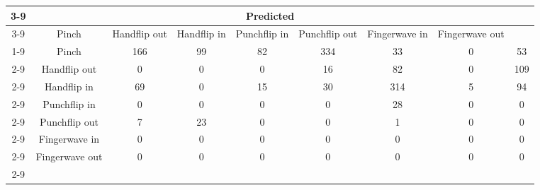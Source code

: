 \documentclass{standalone}
\begin{document}
 
 \begin{tabular}{|c |c |c |c |c |c |c |c |c |}
\cline{3-9}\multicolumn{2}{c|}{} & \multicolumn{7}{c|}{Predicted} \\ 
\cline{3-9} \multicolumn{2}{c |}{ } & Pinch & Handflip out & Handflip in & Punchflip in & Punchflip out & Fingerwave in & Fingerwave out\\ 
\cline{1-9}\multirow{7}{*}{\rotatebox[origin=c]{90}{Actual}} & Pinch & 166 & 99 & 82 & 334 & 33 & 0 & 53\\ 
 \cline{2-9} & Handflip out & 0 & 0 & 0 & 16 & 82 & 0 & 109\\ 
 \cline{2-9} & Handflip in & 69 & 0 & 15 & 30 & 314 & 5 & 94\\ 
 \cline{2-9} & Punchflip in & 0 & 0 & 0 & 0 & 28 & 0 & 0\\ 
 \cline{2-9} & Punchflip out & 7 & 23 & 0 & 0 & 1 & 0 & 0\\ 
 \cline{2-9} & Fingerwave in & 0 & 0 & 0 & 0 & 0 & 0 & 0\\ 
 \cline{2-9} & Fingerwave out & 0 & 0 & 0 & 0 & 0 & 0 & 0\\ 
 \cline{2-9}\hline \end{tabular}
 
\end{document}
